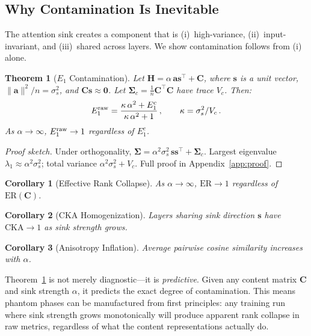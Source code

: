\documentclass[11pt]{article}
\newtheorem{theorem}{Theorem}
\newtheorem{corollary}{Corollary}
\begin{document}
\subsection{Why Contamination Is Inevitable}\label{sec:theorem}

The attention sink creates a component that is (i)~high-variance, (ii)~input-invariant, and (iii)~shared across layers.
We show contamination follows from (i) alone.

\begin{theorem}[$E_1$ Contamination]\label{thm:e1}
Let $\mathbf{H} = \alpha\,\mathbf{a}\mathbf{s}^\top + \mathbf{C}$, where $\mathbf{s}$ is a unit vector, $\|\mathbf{a}\|^2/n = \sigma_s^2$, and $\mathbf{C}\mathbf{s} \approx \mathbf{0}$.
Let $\boldsymbol{\Sigma}_c = \frac{1}{n}\mathbf{C}^\top\mathbf{C}$ have trace $V_c$.
Then:
\begin{equation}\label{eq:e1}
    E_1^{\textup{raw}} = \frac{\kappa\,\alpha^2 + E_1^c}{\kappa\,\alpha^2 + 1}\,,
    \qquad \kappa = \sigma_s^2 / V_c\,.
\end{equation}
As $\alpha \to \infty$, $E_1^{\textup{raw}} \to 1$ regardless of $E_1^c$.
\end{theorem}

\begin{proof}[Proof sketch]
Under orthogonality, $\boldsymbol{\Sigma} = \alpha^2\sigma_s^2\,\mathbf{s}\mathbf{s}^\top + \boldsymbol{\Sigma}_c$.
Largest eigenvalue $\lambda_1 \approx \alpha^2\sigma_s^2$; total variance $\alpha^2\sigma_s^2 + V_c$.
Full proof in Appendix~\ref{app:proof}.
\end{proof}

\begin{corollary}[Effective Rank Collapse]
As $\alpha \to \infty$, $\mathrm{ER} \to 1$ regardless of $\mathrm{ER}(\mathbf{C})$.
\end{corollary}

\begin{corollary}[CKA Homogenization]
Layers sharing sink direction $\mathbf{s}$ have $\mathrm{CKA} \to 1$ as sink strength grows.
\end{corollary}

\begin{corollary}[Anisotropy Inflation]
Average pairwise cosine similarity increases with $\alpha$.
\end{corollary}

Theorem~\ref{thm:e1} is not merely diagnostic---it is \emph{predictive}.
Given any content matrix $\mathbf{C}$ and sink strength $\alpha$, it predicts the exact degree of contamination.
This means phantom phases can be manufactured from first principles: any training run where sink strength grows monotonically will produce apparent rank collapse in raw metrics, regardless of what the content representations actually do.
\end{document}
